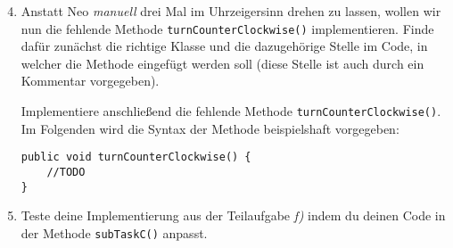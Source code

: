 \begin{enumerate}[label=\alph*)] \setcounter{enumi}{3}
    \item Anstatt Neo \textit{manuell} drei Mal im Uhrzeigersinn drehen zu lassen, wollen wir nun die fehlende Methode \lstinline{turnCounterClockwise()}
    implementieren. Finde dafür zunächst die richtige Klasse und die dazugehörige Stelle im Code, in welcher die Methode eingefügt werden soll (diese Stelle ist auch durch ein Kommentar vorgegeben). \par
    Implementiere anschließend die fehlende Methode \lstinline{turnCounterClockwise()}. Im Folgenden wird die Syntax der Methode beispielshaft vorgegeben:
    \begin{lstlisting}
public void turnCounterClockwise() {
    //TODO
}
    \end{lstlisting}
    \item Teste deine Implementierung aus der Teilaufgabe \textit{f)} indem du deinen Code in der Methode \lstinline{subTaskC()} anpasst.
\end{enumerate}
